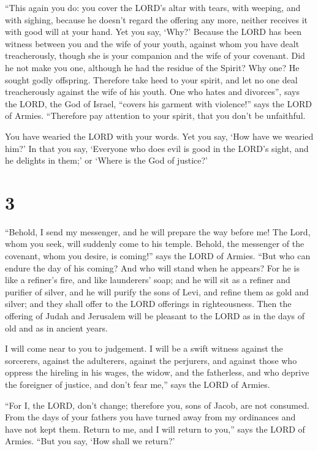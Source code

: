  ``This again you do: you cover the LORD's altar with
tears, with weeping, and with sighing, because he doesn't regard the
offering any more, neither receives it with good will at your hand.
 Yet you say, `Why?' Because the LORD has been witness
between you and the wife of your youth, against whom you have dealt
treacherously, though she is your companion and the wife of your
covenant.  Did he not make you one, although he had the
residue of the Spirit? Why one? He sought godly offspring. Therefore
take heed to your spirit, and let no one deal treacherously against the
wife of his youth.  One who hates and divorces'', says
the LORD, the God of Israel, ``covers his garment with violence!'' says
the LORD of Armies. ``Therefore pay attention to your spirit, that you
don't be unfaithful.

 You have wearied the LORD with your words. Yet you say,
`How have we wearied him?' In that you say, `Everyone who does evil is
good in the LORD's sight, and he delights in them;' or `Where is the God
of justice?'

\hypertarget{section-2}{%
\section{3}\label{section-2}}

 ``Behold, I send my messenger, and he will prepare the
way before me! The Lord, whom you seek, will suddenly come to his
temple. Behold, the messenger of the covenant, whom you desire, is
coming!'' says the LORD of Armies.  ``But who can endure
the day of his coming? And who will stand when he appears? For he is
like a refiner's fire, and like launderers' soap;  and he
will sit as a refiner and purifier of silver, and he will purify the
sons of Levi, and refine them as gold and silver; and they shall offer
to the LORD offerings in righteousness.  Then the offering
of Judah and Jerusalem will be pleasant to the LORD as in the days of
old and as in ancient years.

 I will come near to you to judgement. I will be a swift
witness against the sorcerers, against the adulterers, against the
perjurers, and against those who oppress the hireling in his wages, the
widow, and the fatherless, and who deprive the foreigner of justice, and
don't fear me,'' says the LORD of Armies.

 ``For I, the LORD, don't change; therefore you, sons of
Jacob, are not consumed.  From the days of your fathers
you have turned away from my ordinances and have not kept them. Return
to me, and I will return to you,'' says the LORD of Armies. ``But you
say, `How shall we return?'

